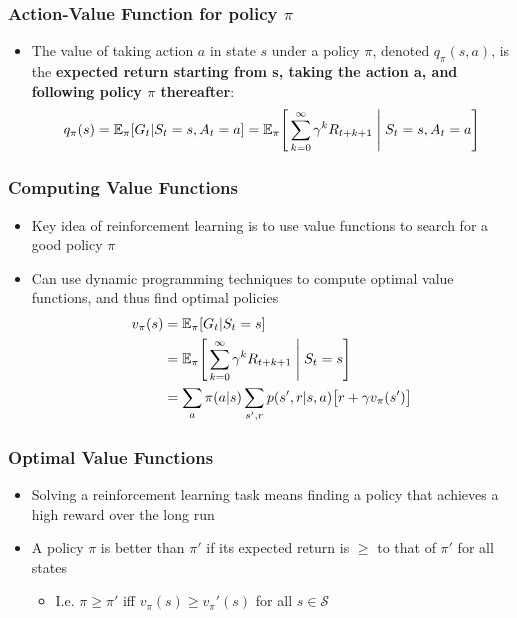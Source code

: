 \documentclass{beamer}
\begin{document}

\begin{frame}
\frametitle{Action-Value Function for policy $\pi$}
\begin{itemize}
\item The value of taking action $a$ in state $s$ under a policy $\pi$, denoted
$q_\pi(s,a)$, is the \textbf{expected return starting from s, taking the action a, and following policy $\pi$ thereafter}:
\begin{equation}
q_\pi(s) = \mathbb{E}_\pi[G_t | S_t = s, A_t = a] = \mathbb{E}_\pi\Bigg[\sum_{k=0}^{\infty} \gamma^k R_{t+k+1} \Biggm\lvert S_t = s, A_t = a \Bigg]
\nonumber
\end{equation}
\end{itemize}
\end{frame}



\begin{frame}
\frametitle{Computing Value Functions}
\begin{itemize}
\item Key idea of reinforcement learning is to use value functions to search for a good policy $\pi$
\item Can use dynamic programming techniques to compute optimal value functions, and thus find optimal policies 
\begin{align*}
v_\pi(s) &= \mathbb{E}_\pi[G_t | S_t = s] \\
&= \mathbb{E}_\pi\Bigg[\sum_{k=0}^{\infty} \gamma^k R_{t+k+1} \Biggm\lvert S_t = s \Bigg] \\
&= \sum_{a}\pi(a|s) \sum_{s',r} p(s',r|s,a) \big[ r + \gamma v_\pi(s') \big]
\nonumber
\end{align*}
\end{itemize}
\end{frame}


\begin{frame}
\frametitle{Optimal Value Functions}
\begin{itemize}
\item Solving a reinforcement learning task means finding a policy that achieves a
high reward over the long run
\item A policy $\pi$ is better than $\pi'$ if its expected return is $\geq$ to that of $\pi'$ for all states
   \begin{itemize}
   	\item I.e. $\pi \geq \pi'$ iff $v_\pi(s) \geq v_\pi'(s)$ for all $s \in \mathscr{S}$
      \end{itemize}
\end{itemize}
\end{frame}
\end{document}
